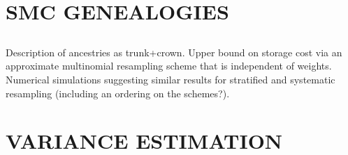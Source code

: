 \documentclass{article}
\begin{document}
\subsection*{\cite{mohle2003}}



%
\section*{SMC GENEALOGIES}

\subsection*{\cite{jacob2015}}
Description of ancestries as trunk+crown. Upper bound on storage cost via an approximate multinomial resampling scheme that is independent of weights. Numerical simulations suggesting similar results for stratified and systematic resampling (including an ordering on the schemes?). 

\subsection*{\cite{koskela2018}}


%
\section*{VARIANCE ESTIMATION}

\subsection*{\cite{chan2013}}


\subsection*{\cite{lee2018}}


\subsection*{\cite{olsson2019}}


%
\end{document}
